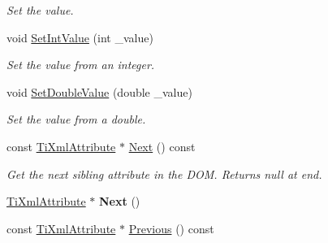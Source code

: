 \begin{DoxyCompactItemize}
\begin{DoxyCompactList}\small\item\em Set the value. \item\end{DoxyCompactList}\item 
\hypertarget{class_ti_xml_attribute_a7e065df640116a62ea4f4b7da5449cc8}{
void \hyperlink{class_ti_xml_attribute_a7e065df640116a62ea4f4b7da5449cc8}{SetIntValue} (int \_\-value)}
\label{class_ti_xml_attribute_a7e065df640116a62ea4f4b7da5449cc8}

\begin{DoxyCompactList}\small\item\em Set the value from an integer. \item\end{DoxyCompactList}\item 
\hypertarget{class_ti_xml_attribute_a0316da31373496c4368ad549bf711394}{
void \hyperlink{class_ti_xml_attribute_a0316da31373496c4368ad549bf711394}{SetDoubleValue} (double \_\-value)}
\label{class_ti_xml_attribute_a0316da31373496c4368ad549bf711394}

\begin{DoxyCompactList}\small\item\em Set the value from a double. \item\end{DoxyCompactList}\item 
\hypertarget{class_ti_xml_attribute_a776478980776a024f7c2846eec640f65}{
const \hyperlink{class_ti_xml_attribute}{TiXmlAttribute} $\ast$ \hyperlink{class_ti_xml_attribute_a776478980776a024f7c2846eec640f65}{Next} () const }
\label{class_ti_xml_attribute_a776478980776a024f7c2846eec640f65}

\begin{DoxyCompactList}\small\item\em Get the next sibling attribute in the DOM. Returns null at end. \item\end{DoxyCompactList}\item 
\hypertarget{class_ti_xml_attribute_a138320aa7793b148ba7e5bd0a0ea4db6}{
\hyperlink{class_ti_xml_attribute}{TiXmlAttribute} $\ast$ {\bfseries Next} ()}
\label{class_ti_xml_attribute_a138320aa7793b148ba7e5bd0a0ea4db6}

\item 
\hypertarget{class_ti_xml_attribute_a54a5f8730c7b02b9a41b74e12e27fe86}{
const \hyperlink{class_ti_xml_attribute}{TiXmlAttribute} $\ast$ \hyperlink{class_ti_xml_attribute_a54a5f8730c7b02b9a41b74e12e27fe86}{Previous} () const }
\label{class_ti_xml_attribute_a54a5f8730c7b02b9a41b74e12e27fe86}


\end{DoxyCompactItemize}
